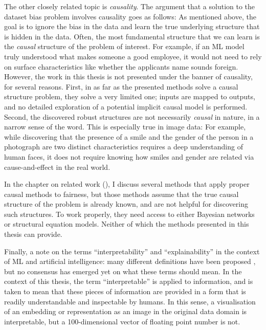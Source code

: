 The other closely related topic is \emph{causality}.
The argument that a solution to the dataset bias problem involves causality goes as follows:
As mentioned above, the goal is to ignore the bias in the data
and learn the true underlying structure that is hidden in the data.
Often, the most fundamental structure that we can learn is the \emph{causal} structure of the problem of interest.
For example, if an \acs{ML} model truly understood what makes someone a good employee,
it would not need to rely on surface characteristics like whether the applicants name sounds foreign.
However, the work in this thesis is not presented under the banner of causality, for several reasons.
First, in as far as the presented methods solve a causal structure problem, they solve a very limited one;
inputs are mapped to outputs, and no detailed exploration of a potential implicit causal model is performed.
Second, the discovered robust structures are not necessarily \emph{causal} in nature, in a narrow sense of the word.
This is especially true in image data:
For example, while discovering that the presence of a smile and the gender of the person in a photograph are two distinct characteristics
requires a deep understanding of human faces,
it does not require knowing how smiles and gender are related via cause-and-effect in the real world.

In the chapter on related work (),
I discuss several methods that apply proper causal methods to fairness,
but those methods assume that the true causal structure of the problem is already known,
and are not helpful for discovering such structures.
To work properly, they need access to either Bayesian networks or structural equation models.
Neither of which the methods presented in this thesis can provide.

Finally, a note on the terms ``interpretability'' and ``explainability'' in the context of \ac{ML} and artificial intelligence:
many different definitions have been proposed \citep{barredoarrieta2020xai},
but no consensus has emerged yet on what these terms should mean.
In the context of this thesis, the term ``interpretable'' is applied to information,
and is taken to mean that these pieces of information are provided in a form that is readily understandable and inspectable by humans.
In this sense, a visualisation of an embedding or representation as an image in the original data domain
is interpretable,
but a 100-dimensional vector of floating point number is not.

